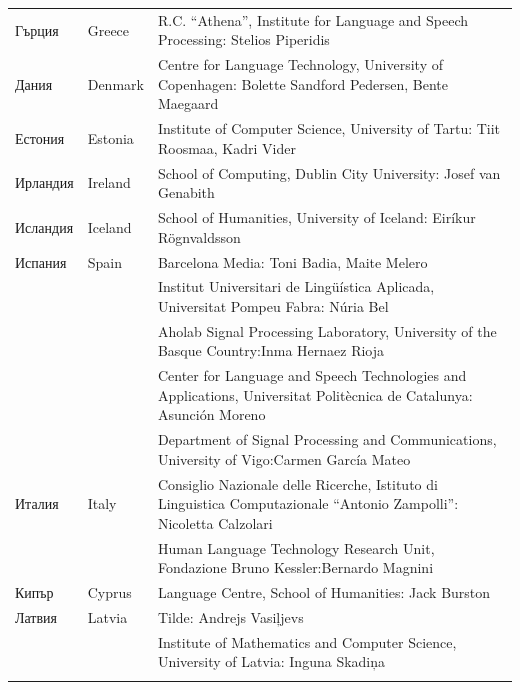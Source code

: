 \documentclass[]{../../metanetpaper}
\begin{document}
\begin{longtable}{@{}llp{110mm}@{}}
  Гърция & \textcolor{grey1}{Greece} & R.C. “Athena”, Institute for Language and Speech Processing: Stelios Piperidis\\ \addlinespace
Дания &  \textcolor{grey1}{Denmark} & Centre for Language Technology,
University of Copenhagen: \newline Bolette Sandford Pedersen, Bente
Maegaard\\ \addlinespace
  Естония & \textcolor{grey1}{Estonia} & Institute of Computer
  Science, University of Tartu: Tiit Roosmaa, Kadri Vider\\
  \addlinespace
  Ирландия & \textcolor{grey1}{Ireland} & School of Computing, Dublin City University: Josef van Genabith\\ \addlinespace
  Исландия & \textcolor{grey1}{Iceland} & School of Humanities, University of Iceland: Eiríkur Rögnvaldsson\\ \addlinespace
  Испания & \textcolor{grey1}{Spain} & Barcelona Media: Toni Badia, Maite Melero \\ \addlinespace 
  & & Institut Universitari de Lingüística Aplicada, Universitat Pompeu Fabra: Núria Bel \\ \addlinespace 
  & & Aholab Signal Processing Laboratory, University of the Basque Country:\newline Inma Hernaez Rioja \\ \addlinespace 
  & & Center for Language and Speech Technologies and Applications, Universitat Politècnica de Catalunya:  Asunción Moreno \\ \addlinespace 
  & & Department of Signal Processing and Communications, University of Vigo:\newline Carmen García Mateo \\ \addlinespace 
  Италия & \textcolor{grey1}{Italy} & Consiglio Nazionale delle Ricerche, Istituto di Linguistica Computazionale “Antonio Zampolli”: Nicoletta Calzolari\\ \addlinespace
  & & Human Language Technology Research Unit, Fondazione Bruno Kessler:\newline Bernardo Magnini\\ \addlinespace 
  Кипър & \textcolor{grey1}{Cyprus} & Language Centre, School of
  Humanities: Jack Burston\\ \addlinespace
  Латвия & \textcolor{grey1}{Latvia} & Tilde: Andrejs Vasiļjevs\\ \addlinespace 
  & & Institute of Mathematics and Computer Science, University of
  Latvia: \newline Inguna Skadiņa\\ \addlinespace

\end{longtable}
\end{document}
